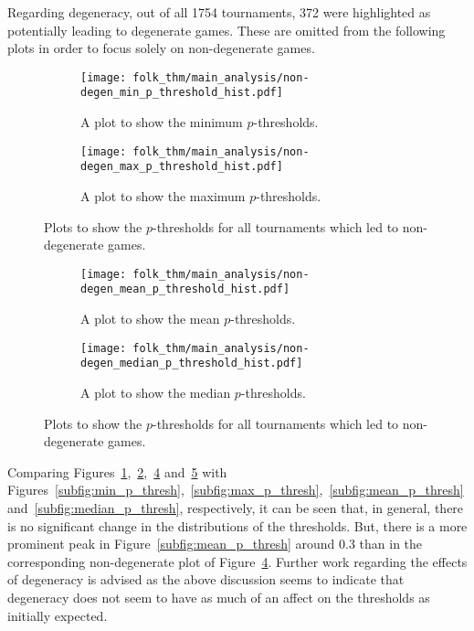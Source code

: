 Regarding degeneracy, out of all 1754 tournaments, 372 were highlighted as
potentially leading to degenerate games.
These are omitted from the following plots in order to focus solely on
non-degenerate games.

\begin{figure}
    \begin{subfigure}{0.45\textwidth}
        \centering
        \texttt{[image: folk\_thm/main\_analysis/non-degen\_min\_p\_threshold\_hist.pdf]}
        \caption{A plot to show the minimum \(p\)-thresholds.}\label{subfig:non_degen_min_p_thresh}
    \end{subfigure}
    \begin{subfigure}{0.45\textwidth}
        \centering
        \texttt{[image: folk\_thm/main\_analysis/non-degen\_max\_p\_threshold\_hist.pdf]}
        \caption{A plot to show the maximum \(p\)-thresholds.}\label{subfig:non_degen_max_p_thresh}
    \end{subfigure}
    \caption{Plots to show the \(p\)-thresholds for all tournaments which led to non-degenerate games.}\label{fig:non_degen_min_max_p_thresh}
\end{figure}


\begin{figure}
    \begin{subfigure}{0.45\textwidth}
        \centering
        \texttt{[image: folk\_thm/main\_analysis/non-degen\_mean\_p\_threshold\_hist.pdf]}
        \caption{A plot to show the mean \(p\)-thresholds.}\label{subfig:non_degen_mean_p_thresh}
    \end{subfigure}
    \begin{subfigure}{0.45\textwidth}
        \centering
        \texttt{[image: folk\_thm/main\_analysis/non-degen\_median\_p\_threshold\_hist.pdf]}
        \caption{A plot to show the median \(p\)-thresholds.}\label{subfig:non_degen_median_p_thresh}
    \end{subfigure}
    \caption{Plots to show the \(p\)-thresholds for all tournaments which led to non-degenerate games.}\label{fig:non_degen_mean_median_p_thresh}
\end{figure}

Comparing Figures~\ref{subfig:non_degen_min_p_thresh},~\ref{subfig:non_degen_max_p_thresh},~\ref{subfig:non_degen_mean_p_thresh}
and~\ref{subfig:non_degen_median_p_thresh} with 
Figures~\ref{subfig:min_p_thresh},~\ref{subfig:max_p_thresh},~\ref{subfig:mean_p_thresh}
and~\ref{subfig:median_p_thresh}, respectively, it can be seen that, in general,
there is no significant change in the distributions of the thresholds. But,
there is a more prominent peak in Figure~\ref{subfig:mean_p_thresh} around 0.3
than in the corresponding non-degenerate plot of
Figure~\ref{subfig:non_degen_mean_p_thresh}. Further work regarding the effects
of degeneracy is advised as the above discussion seems to indicate that
degeneracy does not seem to have as much of an affect on the thresholds as initially expected.


